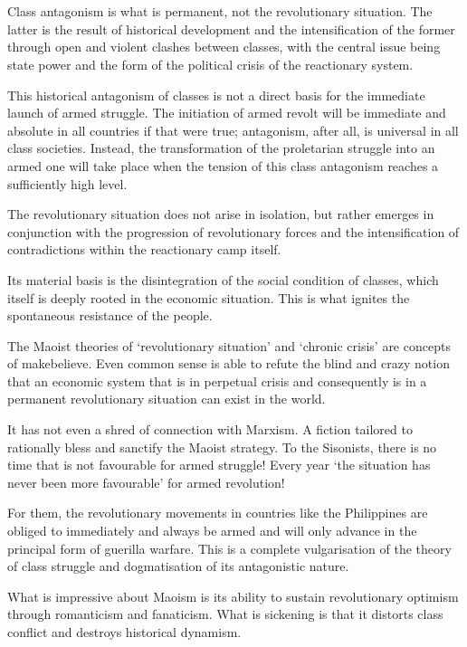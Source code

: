 \section{}
Class antagonism is what is permanent, 
not the revolutionary situation. 
The latter is the result of historical development 
and the intensification of the former 
through open and violent clashes between classes, 
with the central issue being state power 
and the form of the political crisis of the reactionary system.

This historical antagonism of classes 
is not a direct basis 
for the immediate launch of armed struggle. 
The initiation of armed revolt 
will be immediate and absolute in all countries 
if that were true;
antagonism, after all, is universal in all class societies. 
Instead, the transformation of the proletarian struggle into an armed one 
will take place when the tension of this class antagonism
reaches a sufficiently high level.

The revolutionary situation does not arise in isolation, 
but rather emerges in conjunction with the progression of revolutionary forces 
and the intensification of contradictions within the reactionary camp itself.

Its material basis 
is the disintegration of the social condition of classes, 
which itself is deeply rooted in the economic situation. 
This is what ignites the spontaneous resistance of the people.

The Maoist theories of `revolutionary situation' and `chronic crisis' 
are concepts of makebelieve. 
Even common sense is able to refute the blind and crazy notion 
that an economic system that is in perpetual crisis and
consequently is in a permanent revolutionary situation
can exist in the world.

It has not even a shred of connection with Marxism. 
A fiction tailored to rationally bless and sanctify the Maoist strategy. 
To the Sisonists, there is no time that is not favourable for armed struggle! 
Every year `the situation has never been more favourable' for armed revolution!

For them, the revolutionary movements in countries like the Philippines 
are obliged to immediately and always be armed 
and will only advance in the principal form of guerilla warfare. 
This is a complete vulgarisation of the theory of class struggle and 
dogmatisation of its antagonistic nature.

What is impressive about Maoism is its ability to sustain 
revolutionary optimism through romanticism and fanaticism. 
What is sickening is that it distorts class conflict 
and destroys historical dynamism.

